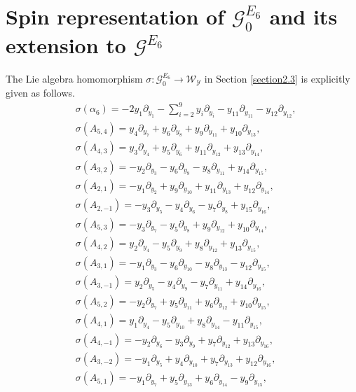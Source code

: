\documentclass[12pt]{article}
\numberwithin{equation}{section}
\theoremstyle{definition}
\theoremstyle{remark}
\begin{document}
\appendix
\section{Spin representation of $\mathscr{G}^{E_6}_0$ and its extension to $\mathscr{G}^{E_6}$} \label{app}
The Lie algebra homomorphism $\sigma:\mathscr{G}^{E_6}_0\longrightarrow\mathscr{W}_{\mathscr{Y}}$ in Section \ref{section2.3} is explicitly given as follows.
\begin{align}
	&\sigma(\alpha_6)=-2y_1\partial_{y_{1}}-\sum\limits_{i=2}^{9}y_i\partial_{y_i}-y_{11}\partial_{y_{11}}-y_{12}\partial_{y_{12}},\\
	&\sigma(A_{5,4})=y_4\partial_{y_7}+y_6\partial_{y_8}+y_9\partial_{y_{11}}+y_{10}\partial_{y_{13}},\\
	&\sigma(A_{4,3})=y_3\partial_{y_4}+y_5\partial_{y_6}+y_{11}\partial_{y_{12}}+y_{13}\partial_{y_{14}},\\
	&\sigma(A_{3,2})=-y_2\partial_{y_3}-y_6\partial_{y_9}-y_8\partial_{y_{11}}+y_{14}\partial_{y_{15}},\\
	&\sigma(A_{2,1})=-y_1\partial_{y_2}+y_9\partial_{y_{10}}+y_{11}\partial_{y_{13}}+y_{12}\partial_{y_{14}},\\
	&\sigma(A_{2,-1})=-y_3\partial_{y_5}-y_4\partial_{y_6}-y_7\partial_{y_8}+y_{15}\partial_{y_{16}},\\
	&\sigma(A_{5,3})=-y_3\partial_{y_7}-y_5\partial_{y_8}+y_9\partial_{y_{12}}+y_{10}\partial_{y_{14}},\\
	&\sigma(A_{4,2})=y_{2}\partial_{y_4}-y_5\partial_{y_9}+y_8\partial_{y_{12}}+y_{13}\partial_{y_{15}},\\
	&\sigma(A_{3,1})=-y_1\partial_{y_3}-y_6\partial_{y_{10}}-y_8\partial_{y_{13}}-y_{12}\partial_{y_{15}},\\
	&\sigma(A_{3,-1})=y_2\partial_{y_5}-y_4\partial_{y_9}-y_7\partial_{y_{11}}+y_{14}\partial_{y_{16}},\\
	&\sigma(A_{5,2})=-y_2\partial_{y_7}+y_5\partial_{y_{11}}+y_6\partial_{y_{12}}+y_{10}\partial_{y_{15}},\\
	&\sigma(A_{4,1})=y_1\partial_{y_4}-y_5\partial_{y_{10}}+y_{8}\partial_{y_{14}}-y_{11}\partial_{y_{15}},\\
	&\sigma(A_{4,-1})=-y_2\partial_{y_6}-y_{3}\partial_{y_9}+y_7\partial_{y_{12}}+y_{13}\partial_{y_{16}},\\
	&\sigma(A_{3,-2})=-y_1\partial_{y_5}+y_4\partial_{y_{10}}+y_7\partial_{y_{13}}+y_{12}\partial_{y_{16}},\\
	&\sigma(A_{5,1})=-y_1\partial_{y_7}+y_5\partial_{y_{13}}+y_6\partial_{y_{14}}-y_9\partial_{y_{15}},\\

\end{align}
\end{document}
